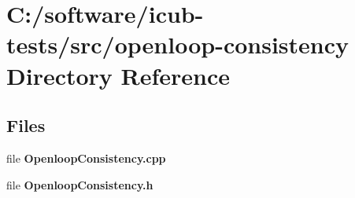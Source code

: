 \section{C\+:/software/icub-\/tests/src/openloop-\/consistency Directory Reference}
\label{dir_f9de59b413a1f1ae04ea264c82cc2719}
\subsection*{Files}
\begin{DoxyCompactItemize}
\item 
file {\bfseries Openloop\+Consistency.\+cpp}
\item 
file {\bfseries Openloop\+Consistency.\+h}
\end{DoxyCompactItemize}

